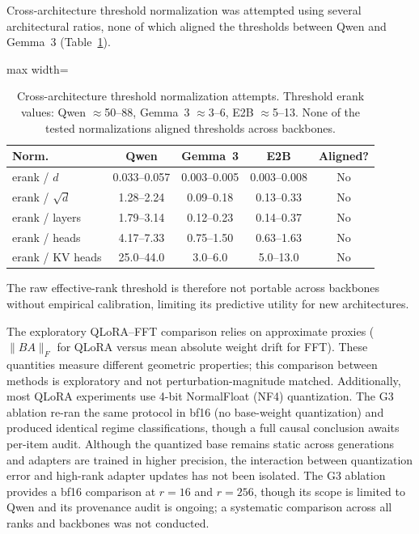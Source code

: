 \documentclass[a4paper,fleqn]{cas-dc}
\newif\ifshowchanges
\newcommand{\rev}[1]{\ifshowchanges{\color{blue}#1}\else{#1}\fi}
\renewcommand{\arraystretch}{1.8}
\begin{document}
Cross-architecture threshold normalization was attempted using several
architectural ratios, none of which aligned the thresholds between Qwen and
Gemma~3 (Table~\ref{tab:normalization}).

\begin{table}[pos=htbp]
\caption{Cross-architecture threshold normalization attempts. Threshold erank
values: Qwen ${\approx}$50--88, Gemma~3 ${\approx}$3--6, E2B ${\approx}$5--13. None of
the tested normalizations aligned thresholds across
backbones.}\label{tab:normalization}
\footnotesize
\renewcommand{\arraystretch}{1.4}
\begin{adjustbox}{max width=\columnwidth}
\begin{tabular}{@{}lcccc@{}}
\toprule
\textbf{Norm.} & \textbf{Qwen} & \textbf{Gemma~3} & \textbf{E2B} & \textbf{Aligned?} \\
\midrule
erank / $d$        & 0.033--0.057 & 0.003--0.005 & 0.003--0.008 & No \\
\addlinespace
erank / $\sqrt{d}$ & 1.28--2.24   & 0.09--0.18   & 0.13--0.33   & No \\
\addlinespace
erank / layers     & 1.79--3.14   & 0.12--0.23   & 0.14--0.37   & No \\
\addlinespace
erank / heads      & 4.17--7.33   & 0.75--1.50   & 0.63--1.63   & No \\
\addlinespace
erank / KV heads   & 25.0--44.0   & 3.0--6.0     & 5.0--13.0    & No \\
\bottomrule
\end{tabular}
\end{adjustbox}
\end{table}

\noindent The raw effective-rank threshold is
therefore not portable across backbones without empirical calibration, limiting
its predictive utility for new architectures.

\rev{The exploratory QLoRA--FFT comparison} relies on approximate
proxies ($\|BA\|_F$ for QLoRA versus mean absolute weight drift for FFT). These
\rev{quantities measure different geometric properties; this comparison between methods is exploratory and not perturbation-magnitude matched.} Additionally,
\rev{most QLoRA experiments use 4-bit NormalFloat (NF4) quantization. The G3 ablation re-ran the same protocol in bf16 (no base-weight quantization) and produced identical regime classifications, though a full causal conclusion awaits per-item audit. Although}
the quantized base remains static across generations and adapters are trained in
higher precision, the interaction between quantization error and high-rank
adapter updates has not been isolated. \rev{The G3 ablation provides a bf16 comparison at $r=16$ and $r=256$, though its scope is limited to Qwen and its provenance audit is ongoing; a systematic comparison across all ranks and backbones was not conducted.}
\end{document}
